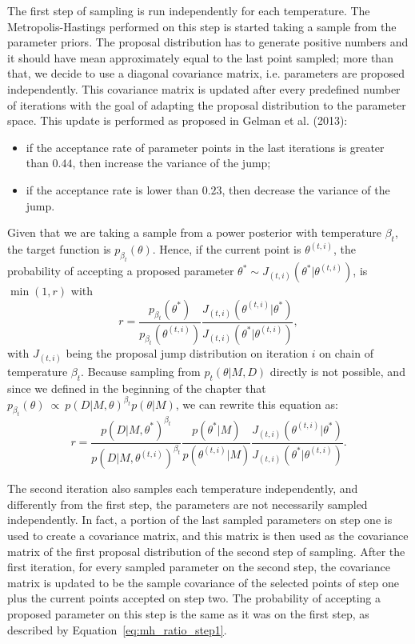 The first step of sampling is run independently for each temperature. 
The Metropolis-Hastings performed on this step is started taking a 
sample from the parameter priors. The proposal distribution has to 
generate positive numbers and it should have mean approximately equal to 
the last point sampled; more than that, we decide to use a diagonal 
covariance matrix, i.e. parameters are proposed independently. This 
covariance matrix is updated after every predefined number of iterations 
with the goal of adapting the proposal distribution to the parameter 
space. This update is performed as proposed in Gelman et al. (2013): 
\begin{itemize}
\item{if the acceptance rate of parameter points in the last 
    iterations is greater than $0.44$, then increase the variance of the
    jump;}
\item{if the acceptance rate is lower than $0.23$, then decrease the 
    variance of the jump.}
\end{itemize}
Given that we are taking a sample from a power posterior with 
temperature $\beta_t$, the target function is 
$p_{\beta_t} (\theta)$. Hence, if the current point 
is $\theta^{(t, i)}$, the probability of accepting a proposed parameter 
$\theta^* \sim J_{(t, i)} (\theta^* | \theta^{(t, i)})$, is 
$\min (1, r)$ with
\begin{equation*}
    r = \frac{p_{\beta_t} (\theta^*)}
             {p_{\beta_t} (\theta^{(t, i)})}
        \frac{J_{(t, i)} (\theta^{(t, i)} | \theta^*)}
             {J_{(t, i)} (\theta^* | \theta^{(t, i)})},
\end{equation*}
with $J_{(t, i)}$ being the proposal jump distribution on iteration $i$ 
on chain of temperature $\beta_t$. Because sampling from $p_t(\theta | 
M, D)$ directly is not possible, and  since we defined in the beginning 
of the chapter that 
$p_{\beta_t} (\theta)~\propto~p (D|M, \theta)^{\beta_t} p (\theta | M)$,
we can rewrite this equation as:
\begin{equation}
    r = \frac{p (D | M, \theta^*)^{\beta_t}}
             {p (D | M, \theta^{(t, i)})^{\beta_t}}
        \frac{p (\theta^* | M)}
             {p (\theta^{(t, i)} | M)}
        \frac{J_{(t, i)} (\theta^{(t, i)} | \theta^*)}
             {J_{(t, i)} (\theta^* | \theta^{(t, i)})}.
    \label{eq:mh_ratio_step1}
\end{equation}

The second iteration also samples each temperature independently, and
differently from the first step, the parameters are not necessarily 
sampled independently. In fact, a portion of the last sampled parameters
on step one is used to create a covariance matrix, and this matrix is
then used as the covariance matrix of the first proposal distribution of 
the second step of sampling. After the first iteration, for every 
sampled parameter on the second step, the covariance matrix is updated 
to be the sample covariance of the selected points of step one plus the  
current points accepted on step two. The probability of accepting a 
proposed parameter on this step is the same  as it was on the first 
step, as described by Equation~\ref{eq:mh_ratio_step1}.

